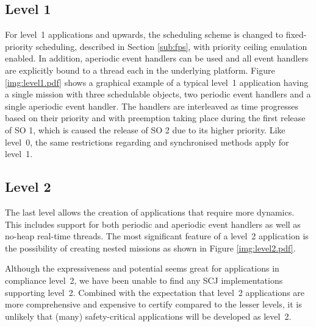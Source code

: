 \subsection{Level 1}
For level~1 applications and upwards, the scheduling scheme is changed to fixed-priority scheduling, described in Section \ref{sub:fps}, with priority ceiling emulation enabled. In addition, aperiodic event handlers can be used and all event handlers are explicitly bound to a thread each in the underlying platform. Figure \ref{img:level1.pdf} shows a graphical example of a typical level~1 application having a single mission with three schedulable objects, two periodic event handlers and a single aperiodic event handler. The handlers are interleaved as time progresses based on their priority and with preemption taking place during the first release of SO 1, which is caused the release of SO 2 due to its higher priority. Like level~0, the same restrictions regarding  and synchronised methods apply for level~1.


\subsection{Level 2}
The last level allows the creation of applications that require more dynamics. This includes support for both periodic and aperiodic event handlers as well as no-heap real-time threads. The most significant feature of a level~2 application is the possibility of creating nested missions as shown in Figure \ref{img:level2.pdf}.


Although the expressiveness and potential seems great for applications in compliance level~2, we have been unable to find any SCJ implementations supporting level~2. Combined with the expectation that level~2 applications are more comprehensive and expensive to certify compared to the lesser levels, it is unlikely that (many) safety-critical applications will be developed as level~2.
